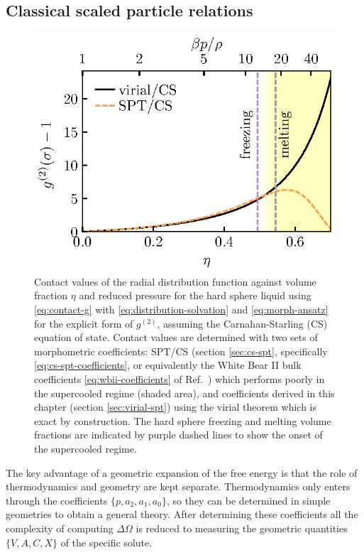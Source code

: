 \documentclass[11pt,twoside]{report}
\begin{document}
\subsection{Classical scaled particle relations}
\label{sec:classical-spt}

\begin{figure}
  \includegraphics[width=0.9\linewidth,outer]{g2-contact}
  \caption[Contact values of pair distribution function $g^{(2)}(r)$]{
    Contact values of the radial distribution function against volume fraction $\eta$ and reduced pressure for the hard sphere liquid using \eqref{eq:contact-g} with \eqref{eq:distribution-solvation} and \eqref{eq:morph-ansatz} for the explicit form of $g^{(2)}$, assuming the Carnahan-Starling (CS) equation of state.
    Contact values are determined with two sets of morphometric coefficients: SPT/CS (section \ref{sec:cs-spt}, specifically \eqref{eq:cs-spt-coefficients}, or equivalently the White Bear II bulk coefficients \eqref{eq:wbii-coefficients} of Ref.\ \cite{Hansen-GoosJPCM2006}) which performs poorly in the supercooled regime (shaded area), and coefficients derived in this chapter (section \ref{sec:virial-spt}) using the virial theorem which is exact by construction.
    The hard sphere freezing and melting volume fractions are indicated by purple dashed lines to show the onset of the supercooled regime.
  }
  \label{fig:contact-g}
\end{figure}

The key advantage of a geometric expansion of the free energy is that the role of thermodynamics and geometry are kept separate.
Thermodynamics only enters through the coefficients $\{p,a_2,a_1,a_0\}$, so they can be determined in simple geometries to obtain a general theory.
After determining these coefficients all the complexity of computing $\Delta \Omega$ is reduced to measuring the geometric quantities $\{V,A,C,X\}$ of the specific solute.
\end{document}
